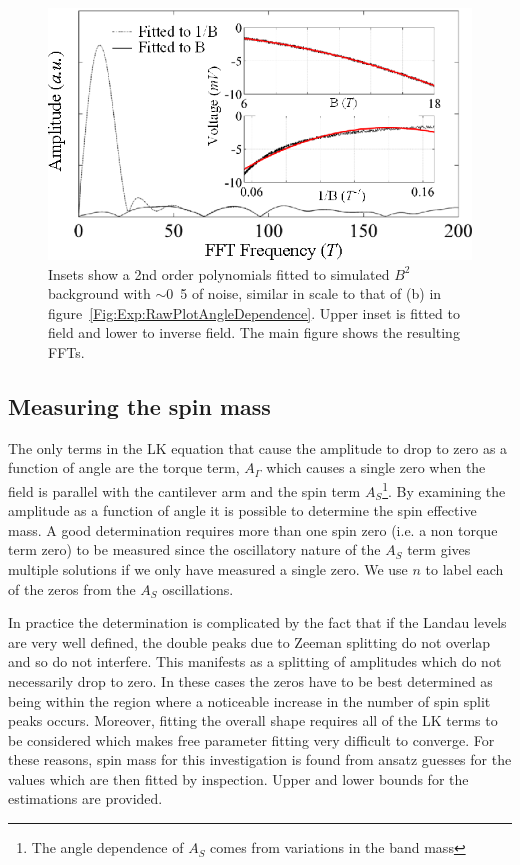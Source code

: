 \begin{figure}[h!]
    \begin{center}
        \includegraphics[scale=0.9]{Chapter-ExperimentalTechnique/Figures/ComparisonBackgroundSubtraction/ComparisonBackgroundSubtraction}
        \caption{Insets show a 2nd order polynomials fitted to simulated $B^2$ background with $\sim$\unit{0.5}{\milli\volt} of noise, similar in scale to that of (b) in figure~\ref{Fig:Exp:RawPlotAngleDependence}. Upper inset is fitted to field and lower to inverse field. The main figure shows the resulting \acp{FFT}.}
        \label{Fig:Exp:BackgroundSubtraction}
    \end{center}
\end{figure}

\subsection{Measuring the spin mass}
\label{Sec:Exp:MeasuringSpinMass}

The only terms in the \ac{LK} equation that cause the amplitude to drop to zero as a function of angle are the torque term, $A_\Gamma$ which causes a single zero when the field is parallel with the cantilever arm and the spin term $A_S$\footnote{The angle dependence of $A_S$ comes from variations in the band mass}. By examining the amplitude as a function of angle it is possible to determine the spin effective mass. A good determination requires more than one spin zero (i.e. a non torque term zero) to be measured since the oscillatory nature of the $A_S$ term gives multiple solutions if we only have measured a single zero. We use $n$ to label each of the zeros from the $A_S$ oscillations.

In practice the determination is complicated by the fact that if the Landau levels are very well defined, the double peaks due to Zeeman splitting do not overlap and so do not interfere. This manifests as a splitting of amplitudes which do not necessarily drop to zero. In these cases the zeros have to be best determined as being within the region where a noticeable increase in the number of spin split peaks occurs. Moreover, fitting the overall shape requires all of the \ac{LK} terms to be considered which makes free parameter fitting very difficult to converge. For these reasons, spin mass for this investigation is found from ansatz guesses for the values which are then fitted by inspection. Upper and lower bounds for the estimations are provided.

